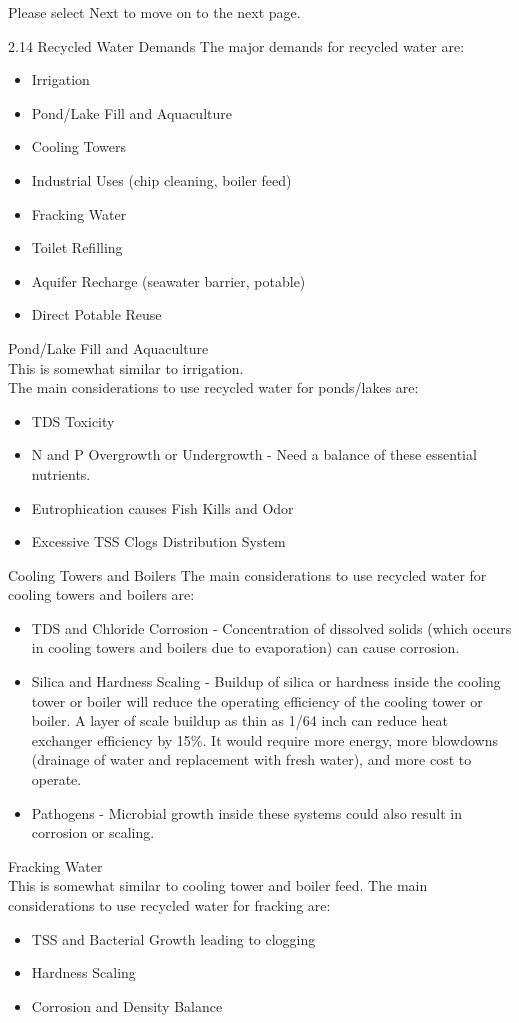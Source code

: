 \documentclass{article}
\begin{document}
Please select Next to move on to the next page.
  
2.14 Recycled Water Demands
The major demands for recycled water are:
\begin{itemize}
\item Irrigation
\item Pond/Lake Fill and Aquaculture
\item Cooling Towers
\item Industrial Uses (chip cleaning, boiler feed)
\item Fracking Water
\item Toilet Refilling
\item Aquifer Recharge (seawater barrier, potable)
\item Direct Potable Reuse
\end{itemize}

Pond/Lake Fill and Aquaculture\\
This is somewhat similar to irrigation. \\
The main considerations to use recycled water for ponds/lakes are:
\begin{itemize}
\item TDS Toxicity\\
\item N and P Overgrowth or Undergrowth - Need a balance of these essential nutrients.\\
\item Eutrophication causes Fish Kills and Odor\\
\item Excessive TSS Clogs Distribution System\\
\end{itemize}
Cooling Towers and Boilers
The main considerations to use recycled water for cooling towers and boilers are:
\begin{itemize}
\item TDS and Chloride Corrosion - Concentration of dissolved solids (which occurs in cooling towers and boilers due to evaporation) can cause corrosion.
\item Silica and Hardness Scaling - Buildup of silica or hardness inside the cooling tower or boiler will reduce the operating efficiency of the cooling tower or boiler. A layer of scale buildup as thin as 1/64 inch can reduce heat exchanger efficiency by 15\%.  It would require more energy, more blowdowns (drainage of water and replacement with fresh water), and more cost to operate.
\item Pathogens - Microbial growth inside these systems could also result in corrosion or scaling.  
\end{itemize}
Fracking Water\\
This is somewhat similar to cooling tower and boiler feed.  The main considerations to use recycled water for fracking are:
\begin{itemize}
\item TSS and Bacterial Growth leading to clogging
\item Hardness Scaling
\item Corrosion and Density Balance
\end{itemize}
\end{document}
